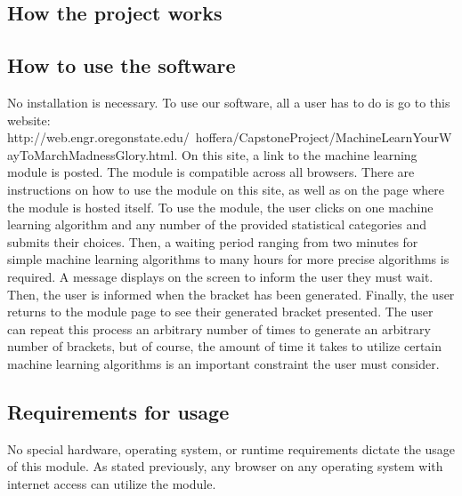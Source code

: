 \documentclass[onecolumn, draftclsnofoot,10pt, compsoc]{IEEEtran}
\begin{document}
\subsection{How the project works}

\subsection{How to use the software}
No installation is necessary. To use our software, all a user has to do is go to this website: http://web.engr.oregonstate.edu/~hoffera/CapstoneProject/MachineLearnYourWayToMarchMadnessGlory.html. On this site, a link to the machine learning module is posted. The module is compatible across all browsers. There are instructions on how to use the module on this site, as well as on the page where the module is hosted itself. To use the module, the user clicks on one machine learning algorithm and any number of the provided statistical categories and submits their choices. Then, a waiting period ranging from two minutes for simple machine learning algorithms to many hours for more precise algorithms is required. A message displays on the screen to inform the user they must wait. Then, the user is informed when the bracket has been generated. Finally, the user returns to the module page to see their generated bracket presented. The user can repeat this process an arbitrary number of times to generate an arbitrary number of brackets, but of course, the amount of time it takes to utilize certain machine learning algorithms is an important constraint the user must consider.
\subsection{Requirements for usage}
No special hardware, operating system, or runtime requirements dictate the usage of this module. As stated previously, any browser on any operating system with internet access can utilize the module.
\end{document}
